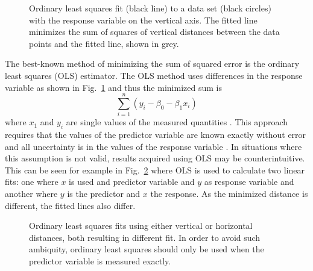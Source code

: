 \documentclass[english, twoside]{HYgradu}
\begin{document}
\begin{figure}
    \centering
    
    \caption{Ordinary least squares fit (black line) to a data set (black circles) with the response variable on the vertical axis. The fitted line minimizes the sum of squares of vertical distances between the data points and the fitted line, shown in grey.}\label{fig:OLS}
\end{figure}

The best-known method of minimizing the sum of squared error is the ordinary least squares (OLS) estimator. The OLS method uses differences in the response variable as shown in Fig.\ \ref{fig:OLS} and thus the minimized sum is
\begin{equation}
	\sum_{i=1}^n (y_i - \beta_0 - \beta_1 x_i)
\end{equation}
where $x_1$ and $y_i$ are single values of the measured quantities \citep{feigelson2012modern}. This approach requires that the values of the predictor variable are known exactly without error and all uncertainty is in the values of the response variable \citep{feigelson2012modern}. In situations where this assumption is not valid, results acquired using OLS may be counterintuitive. This can be seen for example in Fig.\ \ref{fig:OLSproblem} where OLS is used to calculate two linear fits: one where $x$ is used and predictor variable and $y$ as response variable and another where $y$ is the predictor and $x$ the response. As the minimized distance is different, the fitted lines also differ.

\begin{figure}
    \centering
    
    \caption{Ordinary least squares fits using either vertical or horizontal distances, both resulting in different fit. In order to avoid such ambiquity, ordinary least squares should only be used when the predictor variable is measured exactly.}\label{fig:OLSproblem}
\end{figure}
\end{document}
